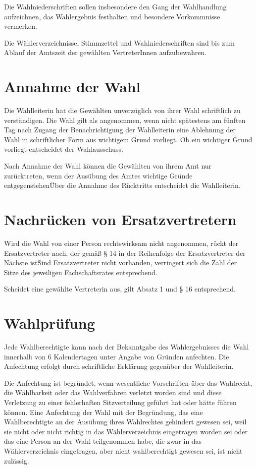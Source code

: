 \begin{multicols}{2}
\Abs \Satz Die Wahlniederschriften sollen insbesondere den Gang der Wahlhandlung aufzeichnen, das Wahlergebnis festhalten und besondere Vorkommnisse vermerken.

\Abs \Satz Die Wählerverzeichnisse, Stimmzettel und Wahlniederschriften sind bis zum Ablauf der Amtszeit der gewählten VertreterInnen aufzubewahren.

\section{Annahme der Wahl}
\Abs \Satz Die Wahlleiterin hat die Gewählten unverzüglich von ihrer Wahl schriftlich zu verständigen. Die Wahl gilt als angenommen, wenn nicht spätestens am fünften Tag nach Zugang der Benachrichtigung der Wahlleiterin eine Ablehnung der Wahl in schriftlicher Form aus wichtigem Grund vorliegt. Ob ein wichtiger Grund vorliegt entscheidet der Wahlausschuss.

\Abs \Satz Nach Annahme der Wahl können die Gewählten von ihrem Amt nur zurücktreten, wenn der Ausübung des Amtes wichtige Gründe entgegenstehen\. Über die Annahme des Rücktritts entscheidet die Wahlleiterin.

\section {Nachrücken von Ersatzvertretern}
\Abs \Satz Wird die Wahl von einer Person rechtswirksam nicht angenommen, rückt der Ersatzvertreter nach, der gemäß § 14 in der Reihenfolge der Ersatzvertreter der Nächste ist\. Sind Ersatzvertreter nicht vorhanden, verringert sich die Zahl der Sitze des jeweiligen Fachschaftsrates entsprechend.

\Abs \Satz Scheidet eine gewählte Vertreterin aus, gilt Absatz 1 und § 16 entsprechend.

\section{Wahlprüfung}
\Abs \Satz Jede Wahlberechtigte kann nach der Bekanntgabe des Wahlergebnisses die Wahl innerhalb von 6 Kalendertagen unter Angabe von Gründen anfechten. Die Anfechtung erfolgt durch schriftliche Erklärung gegenüber der Wahlleiterin.

\Abs \Satz Die Anfechtung ist begründet, wenn wesentliche Vorschriften über das Wahlrecht, die Wählbarkeit oder das Wahlverfahren verletzt worden sind und diese Verletzung zu einer fehlerhaften Sitzverteilung geführt hat oder hätte führen können. Eine Anfechtung der Wahl mit der Begründung, das eine Wahlberechtigte an der Ausübung ihres Wahlrechtes gehindert gewesen sei, weil sie nicht oder nicht richtig in das Wählerverzeichnis eingetragen worden sei oder das eine Person an der Wahl teilgenommen habe, die zwar in das Wählerverzeichnis eingetragen, aber nicht wahlberechtigt gewesen sei, ist nicht zulässig.


\end{multicols}
